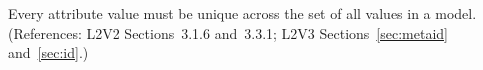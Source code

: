 Every  attribute value must be unique across the set of all
 values in a model.  (References: L2V2 Sections~3.1.6 and~3.3.1;
L2V3 Sections~\ref{sec:metaid} and~\ref{sec:id}.)
